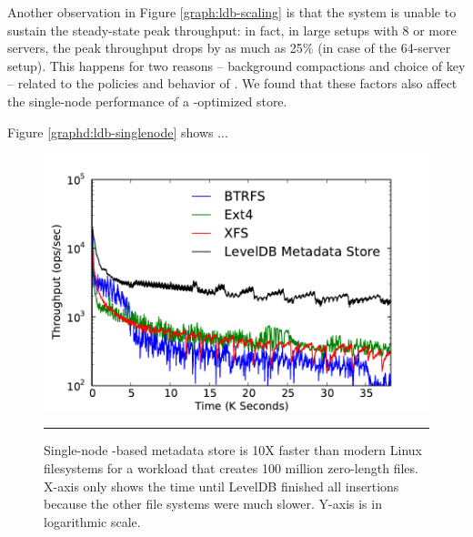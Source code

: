 Another observation in Figure \ref{graph:ldb-scaling} is that the system is
unable to sustain the steady-state peak throughput: in fact, in large setups
with 8 or more servers, the peak throughput drops by as much as 25\% (in case
of the 64-server setup). 
This happens for two reasons -- background compactions and choice of key -- related 
to the policies and behavior of \ldb.
We found that these factors also affect the single-node performance of a
\ldb-optimized store.

Figure \ref{graphd:ldb-singlenode} shows ...

\begin{figure}[t]  %
\centerline{\includegraphics[scale=0.45]{./figs/ldb_insertrate_onenode}}
\caption{
{\small 
Single-node \ldb{}-based metadata store is 10X faster than modern Linux
filesystems for a workload that creates 100 million zero-length files.
X-axis only shows the time until LevelDB finished all insertions because the other 
file systems were much slower. Y-axis is in logarithmic scale.
}
}
\vspace{15pt}
\hrule 
\label{graph:ldb-singlenode}
\end{figure}       %

